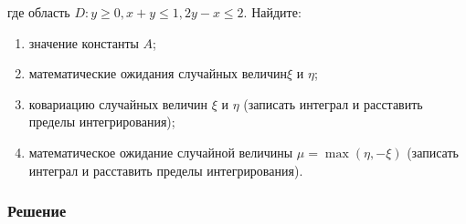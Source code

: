 \documentclass[12pt]{article}
\begin{document}
где область $D: y \geq 0, x + y \leq 1,  2y - x \leq 2$.
Найдите:

\begin{enumerate}
	\item значение константы $A$;
	\item математические ожидания случайных величин$\xi$ и $\eta$;
	\item ковариацию случайных величин $\xi$ и $\eta$ (записать интеграл и расставить пределы интегрирования);
	\item математическое ожидание случайной величины $\mu = \max(\eta, -\xi)$ (записать интеграл и расставить пределы интегрирования).
\end{enumerate}

\subsubsection*{Решение}
\end{document}
